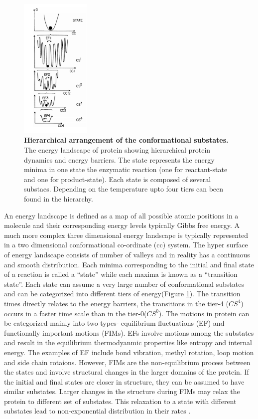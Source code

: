 \begin{figure} %
    \centering
    \includegraphics[width=0.3\textwidth]{energy_landscape}
    \caption{\textbf{Hierarchical arrangement of the conformational substates.} The energy landscape of protein showing hierarchical protein dynamics and energy barriers. The state represents the energy minima in one state the enzymatic reaction (one for reactant-state and one for product-state). Each state is composed of several substaes. Depending on the temperature upto four tiers can been found in the hierarchy.}
    \label{fig:energy_landscape}
\end{figure}

An energy landscape is defined as a map of all possible atomic positions in a molecule and their corresponding energy levels typically Gibbs free energy.
A much more complex three dimensional energy landscape is typically represented in a two dimensional conformational co-ordinate (cc) system.
The hyper surface of energy landscape consists of number of valleys and in reality has a continuous and smooth distribution.
Each minima corresponding to the initial and final state of a reaction is called a ``state'' while each maxima is known as a ``transition state''.
Each state can assume a very large number of conformational substates and can be categorized into different tiers of energy(Figure \ref{fig:energy_landscape}).
The transition times directly relates to the energy barriers, the transitions in the tier-4 ($CS^4$) occurs in a faster time scale than in the tier-0($CS^0$).
The motions in protein can be categorized mainly into two types- equilibrium fluctuations (EF) and  functionally important motions (FIMs).\cite{ansari1985protein}
EFs involve motions among the substates and result in the equilibrium thermodyanmic properties like entropy and internal energy. 
The examples of EF include bond vibration, methyl rotation, loop motion and side chain rotaions.
However, FIMs are the non-equilibrium process between the states and involve structural changes in the larger domains of the protein.
If the initial and final states are closer in structure, they can be assumed to have similar substates. 
Larger changes in the structure during FIMs may relax the protein to different set of substates. This relaxation to a state with different substates lead to non-exponential distribution in their rates .

